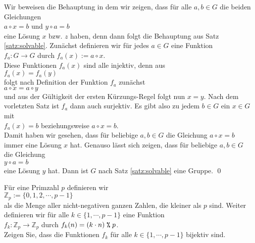 \proof Wir beweisen die Behauptung in dem wir zeigen, dass f\"{u}r alle $a,b \in G$ die beiden Gleichungen
\\[0.2cm]
\hspace*{1.3cm} $a \circ x = b$ \quad und \quad $y \circ a = b$
\\[0.2cm]
eine L\"{o}sung $x$ bzw. $z$ haben, denn dann folgt die Behauptung aus Satz \ref{satz:solvable}.  Zun\"{a}chst definieren wir f\"{u}r
jedes $a \in G$ eine Funktion
\\[0.2cm]
\hspace*{1.3cm} $f_a: G \rightarrow G$ \quad durch \quad $f_a(x) := a \circ x$.
\\[0.2cm]
Diese Funktionen $f_a(x)$ sind alle injektiv, denn aus
\\[0.2cm]
\hspace*{1.3cm} $f_a(x) = f_a(y)$
\\[0.2cm]
folgt nach Definition der Funktion $f_a$ zun\"{a}chst
\\[0.2cm]
\hspace*{1.3cm} $a \circ x = a \circ y$
\\[0.2cm]
und aus der G\"{u}ltigkeit der ersten K\"{u}rzungs-Regel folgt nun $x = y$.  Nach dem vorletzten Satz ist $f_a$ dann
auch surjektiv.  Es gibt also zu jedem $b \in G$ ein $x \in G$ mit
\\[0.2cm]
\hspace*{1.3cm} $f_a(x) = b$ \quad beziehungsweise \quad $a \circ x = b$.
\\[0.2cm]
Damit haben wir gesehen, dass f\"{u}r beliebige $a,b \in G$ die Gleichung $a \circ x = b$ immer eine L\"{o}sung
$x$ hat.  Genauso l\"{a}sst sich  zeigen, dass f\"{u}r beliebige $a,b \in G$ die Gleichung
\\[0.2cm]
\hspace*{1.3cm}
$y \circ a = b$
\\[0.2cm]
eine L\"{o}sung $y$ hat.  Dann ist $G$ nach Satz \ref{satz:solvable} eine Gruppe. \qed

\exercise
F\"{u}r eine Primzahl $p$ definieren wir
\\[0.2cm]
\hspace*{1.3cm}
$\mathbb{Z}_p := \{ 0, 1, 2, \cdots, p - 1 \}$
\\[0.2cm]
als die Menge aller nicht-negativen ganzen Zahlen, die kleiner als $p$ sind.  Weiter
definieren wir f\"{u}r alle $k \in \{1,\cdots,p-1\}$ eine Funktion
\\[0.2cm]
\hspace*{1.3cm}
$f_k: \mathbb{Z}_p \rightarrow \mathbb{Z}_p$ \quad durch \quad $f_k(n) = (k \cdot n) \;\texttt{\symbol{37}}\;p$.
\\[0.2cm]
Zeigen Sie, dass die Funktionen $f_k$ f\"{u}r alle $k \in \{1, \cdots, p-1\}$ bijektiv sind.

